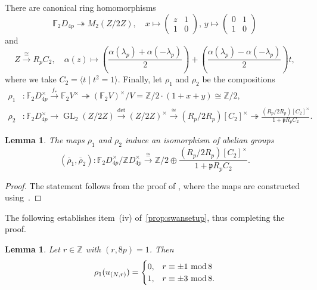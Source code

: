 \documentclass[11pt,leqno,a4paper]{amsart}
\newcommand{\Z}{\mathbb{Z}}
\newcommand{\F}{\mathbb{F}}
\renewcommand{\mod}{\,\,\text{\normalfont mod}\,}
\DeclareMathOperator{\GL}{GL}
\newtheorem{lemma}[thm]{Lemma}
\theoremstyle{definition}
\theoremstyle{remark}
\theoremstyle{custom}
\begin{document}
There are canonical ring homomorphisms
\[ \F_2 D_{4p} \twoheadrightarrow M_2(Z/2Z), \quad x \mapsto \left(\begin{smallmatrix} z & 1\\ 1 & 0 \end{smallmatrix}\right), \, y \mapsto \left(\begin{smallmatrix} 0 & 1\\ 1 & 0 \end{smallmatrix}\right) \] 
 and
\[ Z \xrightarrow[]{\cong} R_p C_2, \quad \alpha(z) \mapsto \left(\frac{\alpha(\lambda_p) + \alpha(-\lambda_p)}{2}\right) + \left(\frac{\alpha(\lambda_p) - \alpha(-\lambda_p)}{2}\right)t, \]
where we take $C_2 = \langle t \mid t^2=1 \rangle$.
Finally, let $\rho_1$ and $\rho_2$ be the compositions
\begin{equation}\label{eq:rhos}
\begin{aligned}
\rho_1 &: \F_2 D_{4p}^\times \xrightarrow[]{f_*} \F_2 V^\times \twoheadrightarrow {(\F_2 V)^\times}/V = \Z/2 \cdot (1+x+y) \cong \Z /2 ,
\\
\rho_2 &: \F_2 D_{4p}^\times \to \GL_2(Z/2Z) \xrightarrow[]{\det} (Z/2Z)^\times \xrightarrow[]{\cong} (R_p/2R_p)[C_2]^\times  \twoheadrightarrow \frac{(R_p/2R_p)[C_2]^\times}{1+\mathfrak{p}R_pC_2}.
\end{aligned} 
\end{equation}

\begin{lemma}\label{prop:rho1rho2}
The maps $\rho_1$ and $\rho_2$ induce an isomorphism of abelian groups
\[
(\overline \rho_1, \overline \rho_2) \colon \F_2 D_{4p}^\times/\Z D_{4p}^\times
\xrightarrow[]{\cong} \Z/2 \oplus \frac{(R_p/2R_p)[C_2]^\times}{1+\mathfrak{p}R_pC_2}.
\]
\end{lemma}

\begin{proof}
The statement follows from the proof of \cite[Lemma 11.1]{Sw83}, where the maps are constructed using~\cite[Lemma 10.5]{Sw83}.	
\end{proof}

The following establishes item~(iv) of~\cref{prop:swansetup}, thus completing the proof.

\begin{lemma}\label{lem:rho1u}
Let $r \in \Z$ with $(r,8p)=1$. Then
\[ \rho_1(u_{(N,r)}) = 
\begin{cases}
0, & r \equiv \pm 1 \mod 8 \\
1, & r \equiv \pm 3 \mod 8. 
\end{cases}
 \]
\end{lemma}
\end{document}

